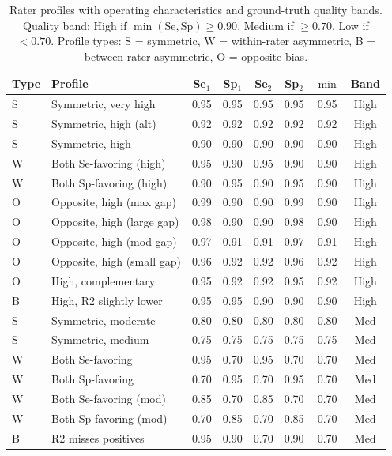 \documentclass[11pt]{article}
\begin{document}
\begin{table}[h!]
\centering
\caption{Rater profiles with operating characteristics and ground-truth quality bands. Quality band: High if $\min(\text{Se}, \text{Sp}) \geq 0.90$, Medium if $\geq 0.70$, Low if $< 0.70$. Profile types: S = symmetric, W = within-rater asymmetric, B = between-rater asymmetric, O = opposite bias.}
\label{tab:profiles}
\scriptsize
\begin{tabular}{llcccccc}
\toprule
Type & Profile & Se$_1$ & Sp$_1$ & Se$_2$ & Sp$_2$ & $\min$ & Band \\
\midrule
S & Symmetric, very high       & 0.95 & 0.95 & 0.95 & 0.95 & 0.95 & High \\
S & Symmetric, high (alt)      & 0.92 & 0.92 & 0.92 & 0.92 & 0.92 & High \\
S & Symmetric, high            & 0.90 & 0.90 & 0.90 & 0.90 & 0.90 & High \\
W & Both Se-favoring (high)    & 0.95 & 0.90 & 0.95 & 0.90 & 0.90 & High \\
W & Both Sp-favoring (high)    & 0.90 & 0.95 & 0.90 & 0.95 & 0.90 & High \\
O & Opposite, high (max gap)   & 0.99 & 0.90 & 0.90 & 0.99 & 0.90 & High \\
O & Opposite, high (large gap) & 0.98 & 0.90 & 0.90 & 0.98 & 0.90 & High \\
O & Opposite, high (mod gap)   & 0.97 & 0.91 & 0.91 & 0.97 & 0.91 & High \\
O & Opposite, high (small gap) & 0.96 & 0.92 & 0.92 & 0.96 & 0.92 & High \\
O & High, complementary        & 0.95 & 0.92 & 0.92 & 0.95 & 0.92 & High \\
B & High, R2 slightly lower    & 0.95 & 0.95 & 0.90 & 0.90 & 0.90 & High \\
\midrule
S & Symmetric, moderate        & 0.80 & 0.80 & 0.80 & 0.80 & 0.80 & Med \\
S & Symmetric, medium          & 0.75 & 0.75 & 0.75 & 0.75 & 0.75 & Med \\
W & Both Se-favoring           & 0.95 & 0.70 & 0.95 & 0.70 & 0.70 & Med \\
W & Both Sp-favoring           & 0.70 & 0.95 & 0.70 & 0.95 & 0.70 & Med \\
W & Both Se-favoring (mod)     & 0.85 & 0.70 & 0.85 & 0.70 & 0.70 & Med \\
W & Both Sp-favoring (mod)     & 0.70 & 0.85 & 0.70 & 0.85 & 0.70 & Med \\
B & R2 misses positives        & 0.95 & 0.90 & 0.70 & 0.90 & 0.70 & Med \\

\end{tabular}
\end{table}
\end{document}
